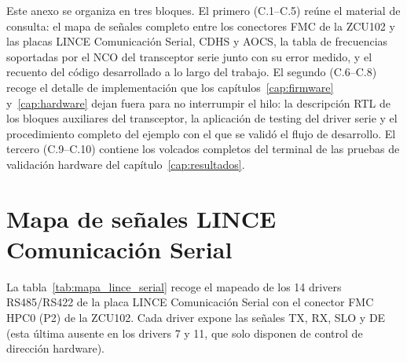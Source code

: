Este anexo se organiza en tres bloques. El primero (C.1--C.5) reúne el material de consulta: el
mapa de señales completo entre los conectores FMC de la ZCU102 y las placas LINCE Comunicación
Serial, CDHS y AOCS, la tabla de frecuencias soportadas por el NCO del transceptor serie junto con
su error medido, y el recuento del código desarrollado a lo largo del trabajo. El segundo
(C.6--C.8) recoge el detalle de implementación que los capítulos~\ref{cap:firmware}
y~\ref{cap:hardware} dejan fuera para no interrumpir el
hilo: la descripción RTL de los bloques auxiliares del transceptor, la aplicación de testing del
driver serie y el procedimiento completo del ejemplo con el que se validó el flujo de desarrollo.
El tercero (C.9--C.10) contiene los volcados completos del terminal de las pruebas de validación
hardware del capítulo~\ref{cap:resultados}.

\section{Mapa de señales LINCE Comunicación Serial} \label{anxC:mapa_serial}

La tabla~\ref{tab:mapa_lince_serial} recoge el mapeado de los 14 drivers RS485/RS422 de la placa
LINCE Comunicación Serial con el conector FMC HPC0 (P2) de la ZCU102. Cada driver expone las
señales TX, RX, SLO y DE (esta última ausente en los drivers 7 y 11, que solo disponen de
control de dirección hardware).

